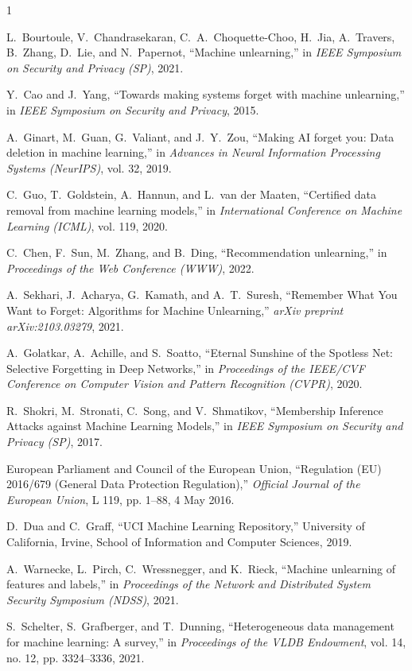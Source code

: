 \begin{thebibliography}{1}

L.~Bourtoule, V.~Chandrasekaran, C.~A.~Choquette-Choo, H.~Jia, A.~Travers, B.~Zhang, D.~Lie, and N.~Papernot, ``Machine unlearning,'' in \emph{IEEE Symposium on Security and Privacy (SP)}, 2021.

Y.~Cao and J.~Yang, ``Towards making systems forget with machine unlearning,'' in \emph{IEEE Symposium on Security and Privacy}, 2015.

A.~Ginart, M.~Guan, G.~Valiant, and J.~Y.~Zou, ``Making AI forget you: Data deletion in machine learning,'' in \emph{Advances in Neural Information Processing Systems (NeurIPS)}, vol. 32, 2019.

C.~Guo, T.~Goldstein, A.~Hannun, and L.~van der Maaten, ``Certified data removal from machine learning models,'' in \emph{International Conference on Machine Learning (ICML)}, vol. 119, 2020.

C.~Chen, F.~Sun, M.~Zhang, and B.~Ding, ``Recommendation unlearning,'' in \emph{Proceedings of the Web Conference (WWW)}, 2022.

A.~Sekhari, J.~Acharya, G.~Kamath, and A.~T.~Suresh, ``Remember What You Want to Forget: Algorithms for Machine Unlearning,'' \emph{arXiv preprint arXiv:2103.03279}, 2021.

A.~Golatkar, A.~Achille, and S.~Soatto, ``Eternal Sunshine of the Spotless Net: Selective Forgetting in Deep Networks,'' in \emph{Proceedings of the IEEE/CVF Conference on Computer Vision and Pattern Recognition (CVPR)}, 2020.

R.~Shokri, M.~Stronati, C.~Song, and V.~Shmatikov, ``Membership Inference Attacks against Machine Learning Models,'' in \emph{IEEE Symposium on Security and Privacy (SP)}, 2017.

European Parliament and Council of the European Union, ``Regulation (EU) 2016/679 (General Data Protection Regulation),'' \emph{Official Journal of the European Union}, L 119, pp. 1--88, 4 May 2016.

D.~Dua and C.~Graff, ``UCI Machine Learning Repository,'' University of California, Irvine, School of Information and Computer Sciences, 2019.

A.~Warnecke, L.~Pirch, C.~Wressnegger, and K.~Rieck, ``Machine unlearning of features and labels,'' in \emph{Proceedings of the Network and Distributed System Security Symposium (NDSS)}, 2021.

S.~Schelter, S.~Grafberger, and T.~Dunning, ``Heterogeneous data management for machine learning: A survey,'' in \emph{Proceedings of the VLDB Endowment}, vol. 14, no. 12, pp. 3324--3336, 2021.

\end{thebibliography}

